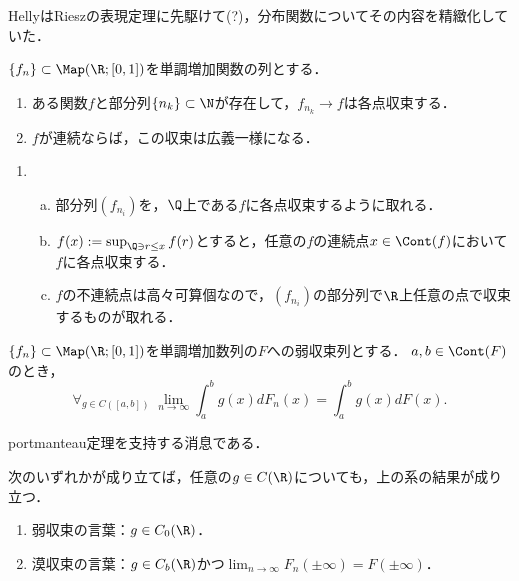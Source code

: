\documentclass[uplatex, dvipdfmx]{jsreport}
\begin{document}
\begin{tcolorbox}[colframe=ForestGreen, colback=ForestGreen!10!white,breakable,colbacktitle=ForestGreen!40!white,coltitle=black,fonttitle=\bfseries\sffamily,
title=]
    HellyはRieszの表現定理に先駆けて(?)，分布関数についてその内容を精緻化していた．
\end{tcolorbox}

\begin{theorem}
    $\{f_n\}\subset\Map(\R;[0,1])$を単調増加関数の列とする．
    \begin{enumerate}
        \item ある関数$f$と部分列$\{n_k\}\subset\N$が存在して，$f_{n_k}\to f$は各点収束する．
        \item $f$が連続ならば，この収束は広義一様になる．
    \end{enumerate}
\end{theorem}
\begin{Proof}\mbox{}
    \begin{enumerate}
        \item \begin{enumerate}[(a)]
            \item 部分列$(f_{n_i})$を，$\Q$上である$f$に各点収束するように取れる．
            \item $f(x):=\sup_{\Q\ni r\le x}f(r)$とすると，任意の$f$の連続点$x\in\Cont(f)$において$f$に各点収束する．
            \item $f$の不連続点は高々可算個なので，$(f_{n_i})$の部分列で$\R$上任意の点で収束するものが取れる．
        \end{enumerate}
    \end{enumerate}
\end{Proof}

\begin{corollary}[Hellyの第二定理]
    $\{f_n\}\subset\Map(\R;[0,1])$を単調増加数列の$F$への弱収束列とする．
    $a,b\in\Cont(F)$のとき，
    \[\forall_{g\in C([a,b])}\;\lim_{n\to\infty}\int^b_ag(x)dF_n(x)=\int^b_ag(x)dF(x).\]
\end{corollary}
\begin{Proof}
    portmanteau定理を支持する消息である．
\end{Proof}

\begin{theorem}
    次のいずれかが成り立てば，任意の$g\in C(\R)$についても，上の系の結果が成り立つ．
    \begin{enumerate}
        \item 弱収束の言葉：$g\in C_0(\R)$．
        \item 漠収束の言葉：$g\in C_b(\R)$かつ$\lim_{n\to\infty}F_n(\pm\infty)=F(\pm\infty)$．
    \end{enumerate}
\end{theorem}
\end{document}
